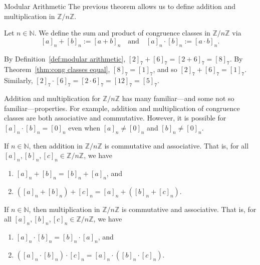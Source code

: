 \begin{section}{Modular Arithmetic}
The previous theorem allows us to define addition and multiplication in $\mathbb{Z}/n\mathbb{Z}$. 

\begin{definition}\label{def:modular arithmetic}
Let $n\in \mathbb{N}$. We define the sum and product of congruence classes in $\mathbb{Z}/n\mathbb{Z}$ via
\[
[a]_n + [b]_n:=[a+b]_n \quad \text{and} \quad [a]_n \cdot [b]_n:=[a\cdot b]_n.
\]
\end{definition}

\begin{example}
By Definition~\ref{def:modular arithmetic}, $[2]_7+[6]_7 = [2+6]_7 = [8]_7$. By Theorem~\ref{thm:cong classes equal}, $[8]_7 = [1]_7$, and so $[2]_7+[6]_7 = [1]_7$. Similarly, $[2]_7\cdot[6]_7 = [2\cdot6]_7 = [12]_7 = [5]_7$.
\end{example}

Addition and multiplication for $\mathbb{Z}/n\mathbb{Z}$ has many familiar---and some not so familiar---properties. For example, addition and multiplication of congruence classes are both associative and commutative. However, it is possible for $[a]_n\cdot[b]_n = [0]_n$ even when $[a]_n \neq [0]_n$ and $[b]_n \neq [0]_n$.

\begin{theorem}\label{thm:modular add comm assoc}
If $n\in \mathbb{N}$, then addition in $\mathbb{Z}/n\mathbb{Z}$ is commutative and associative. That is, for all $[a]_n, [b]_n, [c]_n \in \mathbb{Z}/n\mathbb{Z}$, we have
\begin{enumerate}[label=\textrm{(\alph*)}]
\item $[a]_n + [b]_n = [b]_n + [a]_n$, and
\item\label{modular add assoc} $([a]_n + [b]_n) + [c]_n = [a]_n + ([b]_n + [c]_n)$. 
\end{enumerate}
\end{theorem}

\begin{theorem}\label{thm:modular mult comm assoc}
If $n\in \mathbb{N}$, then multiplication in $\mathbb{Z}/n\mathbb{Z}$ is commutative and associative. That is, for all $[a]_n, [b]_n, [c]_n \in \mathbb{Z}/n\mathbb{Z}$, we have
\begin{enumerate}[label=\textrm{(\alph*)}]
\item $[a]_n \cdot [b]_n = [b]_n \cdot [a]_n$, and
\item\label{modular mult assoc} $([a]_n \cdot [b]_n) \cdot [c]_n = [a]_n \cdot ([b]_n \cdot [c]_n)$.
\end{enumerate}
\end{theorem}


\end{section}
